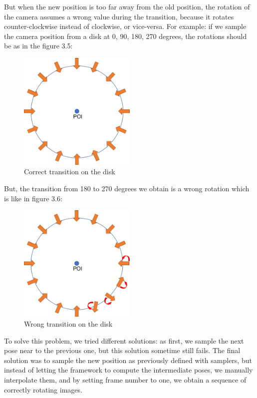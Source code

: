 But when the new position is too far away from the old position, the rotation of the camera assumes a wrong value during the transition, because it rotates counter-clockwise instead of clockwise, or vice-versa.
For example: if we sample the camera position from a disk at 0, 90, 180, 270 degrees, the rotations should be as in the figure 3.5:
\begin{figure}[H]
    \centering
    \includegraphics[width=0.5\textwidth]{images/3_correct_transitions}
    \caption{Correct transition on the disk}\label{fig:correct-transition}
\end{figure}

But, the transition from 180 to 270 degrees we obtain is a wrong rotation which is like in figure 3.6:
\begin{figure}[H]
    \centering
    \includegraphics[width=0.5\textwidth]{images/3_wrong_transitions}
    \caption{Wrong transition on the disk}\label{fig:wrong-transition}
\end{figure}

To solve this problem, we tried different solutions: as first, we sample the next pose near to the previous one, but this solution sometime still fails.
The final solution was to sample the new position as previously defined with samplers, but instead of letting the framework to compute the intermediate poses, we manually interpolate them, and by setting frame number to one, we obtain a sequence of correctly rotating images.

